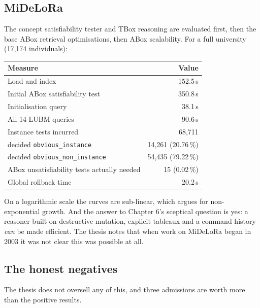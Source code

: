 \documentclass[11pt,a4paper,DIV=12,parskip=half]{scrartcl}
\begin{document}
\subsection{MiDeLoRa}

The concept satisfiability tester and TBox reasoning are evaluated first, then
the base ABox retrieval optimisations, then ABox scalability. For a full
university (17,174 individuals):

\begin{center}
\small
\begin{tabular}{@{}lr@{}}
\toprule
\textbf{Measure} & \textbf{Value} \\
\midrule
Load and index                              & 152.5\,s \\
Initial ABox satisfiability test            & 350.8\,s \\
Initialisation query                        & 38.1\,s \\
All 14 LUBM queries                         & 90.6\,s \\
Instance tests incurred                     & 68,711 \\
\quad decided \texttt{obvious\_instance}    & 14,261 (20.76\,\%) \\
\quad decided \texttt{obvious\_non\_instance} & 54,435 (79.22\,\%) \\
ABox unsatisfiability tests actually needed & 15 (0.02\,\%) \\
Global rollback time                        & 20.2\,s \\
\bottomrule
\end{tabular}
\end{center}

On a logarithmic scale the curves are sub-linear, which argues for
non-exponential growth. And the answer to Chapter 6's sceptical question is yes:
a reasoner built on destructive mutation, explicit tableaux and a command history
\emph{can} be made efficient. The thesis notes that when work on MiDeLoRa began
in 2003 it was not clear this was possible at all.

\subsection{The honest negatives}

The thesis does not oversell any of this, and three admissions are worth more
than the positive results.
\end{document}
